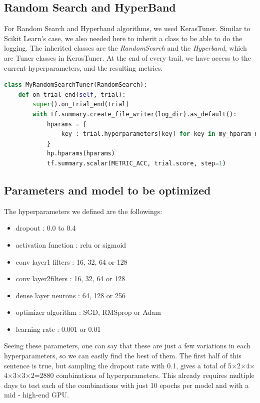 \documentclass[conference]{IEEEtran}
\begin{document}
\subsection{Random Search and HyperBand}
For Random Search and Hyperband algorithms, we used KerasTuner. Similar to Scikit Learn's case, we also needed here to inherit a class to be able to do the logging. The inherited classes are the \emph{RandomSearch} and the \emph{Hyperband}, which are Tuner classes in KerasTuner. At the end of every trail, we have access to the current hyperparameters, and the resulting metrics.
\begin{lstlisting}[language=Python]
class MyRandomSearchTuner(RandomSearch):
    def on_trial_end(self, trial):
        super().on_trial_end(trial)        
        with tf.summary.create_file_writer(log_dir).as_default():
            hparams = {
                key : trial.hyperparameters[key] for key in my_hparam_names
            }
            hp.hparams(hparams)
            tf.summary.scalar(METRIC_ACC, trial.score, step=1)
\end{lstlisting}

\subsection{Parameters and model to be optimized}
The hyperparameters we defined are the followings:
\begin{itemize}
    \item dropout : 0.0 to 0.4
    \item activation function : relu or sigmoid
    \item conv layer1 filters : 16, 32, 64 or 128
    \item conv layer2filters : 16, 32, 64 or 128
    \item dense layer neurons : 64, 128 or 256
    \item optimizer algorithm : SGD, RMSprop or Adam 
    \item learning rate : 0.001 or 0.01
\end{itemize}
Seeing these parameters, one can say that these are just a few variations in each hyperparameters, so we can easily find the best of them. The first half of this sentence is true, but sampling the dropout rate with 0.1, gives a total of 5$\times$2$\times$4$\times$4$\times$3$\times$3$\times$2=2880 combinations of hyperparameters. This already requires multiple days to test each of the combinations with just 10 epochs per model and with a mid - high-end GPU.
\end{document}
